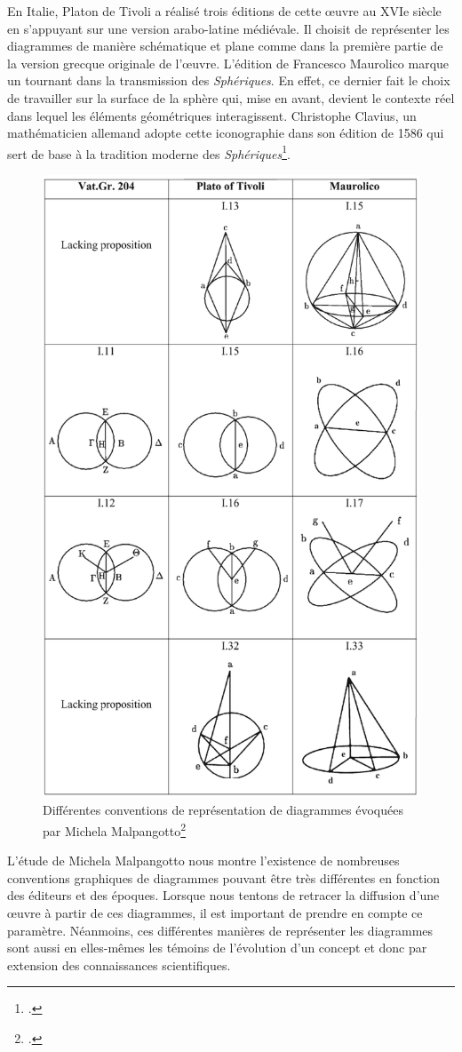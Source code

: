 En Italie, Platon de Tivoli a réalisé trois éditions de cette œuvre au XVIe siècle en s'appuyant sur une version arabo-latine médiévale. Il choisit de représenter les diagrammes de manière schématique et plane comme dans la première partie de la version grecque originale de l'œuvre. L'édition de Francesco Maurolico marque un tournant dans la transmission des \textit{Sphériques}. En effet, ce dernier fait le choix de travailler sur la surface de la sphère qui, mise en avant, devient le contexte réel dans lequel les éléments géométriques interagissent. Christophe Clavius, un mathématicien allemand adopte cette iconographie dans son édition de 1586 qui sert de base à la tradition moderne des \textit{Sphériques}\footcite{malpangottoGraphicalChoicesGeometrical2010}.

\begin{figure}[H]
	\centering
	\includegraphics[width=0.6\linewidth]{images/conventions_diagrammes}
	\caption{Différentes conventions de représentation de diagrammes évoquées par Michela Malpangotto\footcite{malpangottoGraphicalChoicesGeometrical2010}}
	\label{fig:conventions}
\end{figure}


L'étude de Michela Malpangotto nous montre l'existence de nombreuses conventions graphiques de diagrammes pouvant être très différentes en fonction des éditeurs et des époques. Lorsque nous tentons de retracer la diffusion d'une œuvre à partir de ces diagrammes, il est important de prendre en compte ce paramètre. Néanmoins, ces différentes manières de représenter les diagrammes sont aussi en elles-mêmes les témoins de l'évolution d'un concept et donc par extension des connaissances scientifiques. \\


